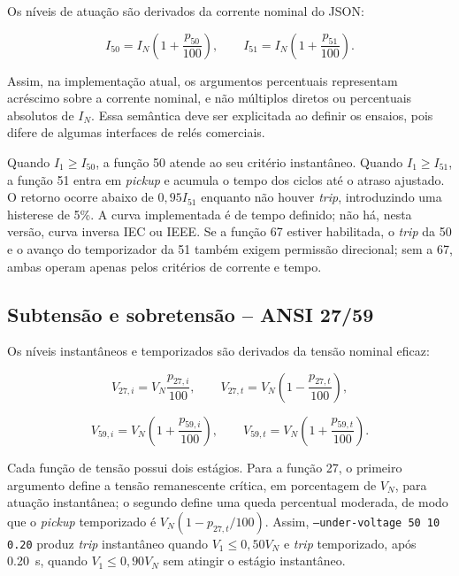 Os níveis de atuação são derivados da corrente nominal do JSON:

\begin{equation}
  I_{50}=I_N\left(1+\frac{p_{50}}{100}\right), \qquad
  I_{51}=I_N\left(1+\frac{p_{51}}{100}\right).
  \label{eq:pickup-sobrecorrente}
\end{equation}

Assim, na implementação atual, os argumentos percentuais representam acréscimo sobre a corrente nominal, e não múltiplos diretos ou percentuais absolutos de $I_N$. Essa semântica deve ser explicitada ao definir os ensaios, pois difere de algumas interfaces de relés comerciais.

Quando $I_1\geq I_{50}$, a função 50 atende ao seu critério instantâneo. Quando $I_1\geq I_{51}$, a função 51 entra em \textit{pickup} e acumula o tempo dos ciclos até o atraso ajustado. O retorno ocorre abaixo de $0{,}95I_{51}$ enquanto não houver \textit{trip}, introduzindo uma histerese de 5\%. A curva implementada é de tempo definido; não há, nesta versão, curva inversa IEC ou IEEE. Se a função 67 estiver habilitada, o \textit{trip} da 50 e o avanço do temporizador da 51 também exigem permissão direcional; sem a 67, ambas operam apenas pelos critérios de corrente e tempo.

\subsection{Subtensão e sobretensão -- ANSI 27/59}

Os níveis instantâneos e temporizados são derivados da tensão nominal eficaz:

\begin{equation}
  V_{27,i}=V_N\frac{p_{27,i}}{100}, \qquad
  V_{27,t}=V_N\left(1-\frac{p_{27,t}}{100}\right),
\end{equation}

\begin{equation}
  V_{59,i}=V_N\left(1+\frac{p_{59,i}}{100}\right), \qquad
  V_{59,t}=V_N\left(1+\frac{p_{59,t}}{100}\right).
\end{equation}

Cada função de tensão possui dois estágios. Para a função 27, o primeiro argumento define a tensão remanescente crítica, em porcentagem de $V_N$, para atuação instantânea; o segundo define uma queda percentual moderada, de modo que o \textit{pickup} temporizado é $V_N(1-p_{27,t}/100)$. Assim, \texttt{--under-voltage 50 10 0.20} produz \textit{trip} instantâneo quando $V_1\leq0{,}50V_N$ e \textit{trip} temporizado, após \SI{0,20}{\second}, quando $V_1\leq0{,}90V_N$ sem atingir o estágio instantâneo.

